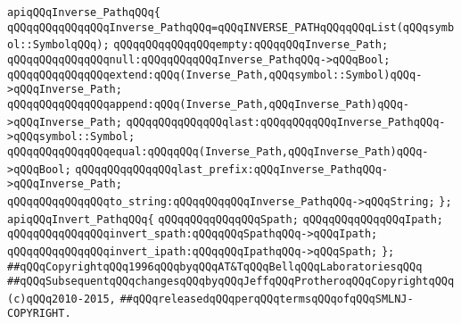 \newline
\verb|apiqQQqInverse_PathqQQq{|\newline
\newline
\verb|qQQqqQQqqQQqqQQqInverse_PathqQQq=qQQqINVERSE_PATHqQQqqQQqList(qQQqsymbol::SymbolqQQq);|\newline
\newline
\verb|qQQqqQQqqQQqqQQqempty:qQQqqQQqInverse_Path;|\newline
\verb|qQQqqQQqqQQqqQQqnull:qQQqqQQqqQQqInverse_PathqQQq->qQQqBool;|\newline
\verb|qQQqqQQqqQQqqQQqextend:qQQq(Inverse_Path,qQQqsymbol::Symbol)qQQq->qQQqInverse_Path;|\newline
\verb|qQQqqQQqqQQqqQQqappend:qQQq(Inverse_Path,qQQqInverse_Path)qQQq->qQQqInverse_Path;|\newline
\verb|qQQqqQQqqQQqqQQqlast:qQQqqQQqqQQqInverse_PathqQQq->qQQqsymbol::Symbol;|\newline
\verb|qQQqqQQqqQQqqQQqequal:qQQqqQQq(Inverse_Path,qQQqInverse_Path)qQQq->qQQqBool;|\newline
\newline
\verb|qQQqqQQqqQQqqQQqlast_prefix:qQQqInverse_PathqQQq->qQQqInverse_Path;|\newline
\verb|qQQqqQQqqQQqqQQqto_string:qQQqqQQqqQQqInverse_PathqQQq->qQQqString;|\newline
\verb|};|\newline
\newline
\verb|apiqQQqInvert_PathqQQq{|\newline
\newline
\verb|qQQqqQQqqQQqqQQqSpath;|\newline
\verb|qQQqqQQqqQQqqQQqIpath;|\newline
\newline
\verb|qQQqqQQqqQQqqQQqinvert_spath:qQQqqQQqSpathqQQq->qQQqIpath;|\newline
\verb|qQQqqQQqqQQqqQQqinvert_ipath:qQQqqQQqIpathqQQq->qQQqSpath;|\newline
\verb|};|\newline
\newline
\newline
\verb|##qQQqCopyrightqQQq1996qQQqbyqQQqAT&TqQQqBellqQQqLaboratoriesqQQq|\newline
\verb|##qQQqSubsequentqQQqchangesqQQqbyqQQqJeffqQQqProtheroqQQqCopyrightqQQq(c)qQQq2010-2015,|\newline
\verb|##qQQqreleasedqQQqperqQQqtermsqQQqofqQQqSMLNJ-COPYRIGHT.|\newline

